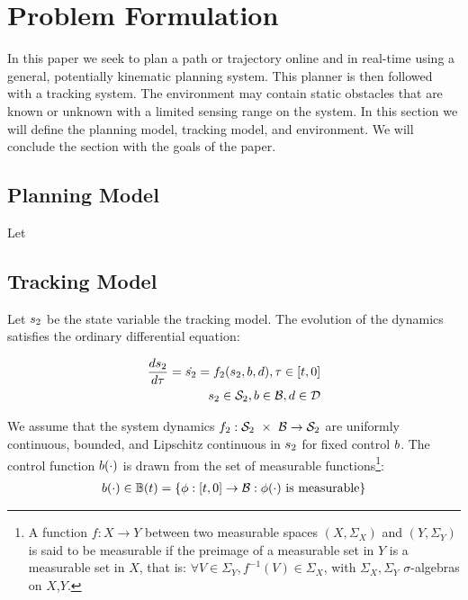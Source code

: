 \section{Problem Formulation \label{sec:formulation}}
In this paper we seek to plan a path or trajectory online and in real-time using a general, potentially kinematic planning system. This planner is then followed with a tracking system. The environment may contain static obstacles that are known or unknown with a limited sensing range on the system. In this section we will define the planning model, tracking model, and environment. We will conclude the section with the goals of the paper.

\subsection{Planning Model}

Let 

\subsection{Tracking Model}
Let $s_2$ be the state variable the tracking model. The evolution of the dynamics satisfies the ordinary differential equation:

\begin{equation}
\begin{aligned}
\label{eq:fdyn}
\frac{ds_2}{d\tau} = \dot{s_2} = f_2(s_2, b, d), \tau \in [t, 0] \\
s_2 \in \mathcal{S}_2, b \in \mathcal{B}, d \in \mathcal{D}
\end{aligned}
\end{equation}

We assume that the system dynamics $f_2 : \mathcal{S}_2\ \times\ \mathcal{B} \rightarrow \mathcal{S}_2$ are uniformly continuous, bounded, and Lipschitz continuous in $s_2$ for fixed control $b$. The control function $b(\cdot)$ is drawn from the set of measurable functions\footnote{A function $f:X\to Y$ between two measurable spaces $(X,\Sigma_X)$ and $(Y,\Sigma_Y)$ is said to be measurable if the preimage of a measurable set in $Y$ is a measurable set in $X$, that is: $\forall V\in\Sigma_Y, f^{-1}(V)\in\Sigma_X$, with $\Sigma_X,\Sigma_Y$ $\sigma$-algebras on $X$,$Y$.}:
\begin{equation}
\begin{aligned}
b(\cdot) \in \mathbb{B}(t) = \{\phi: [t, 0] \rightarrow \mathcal{B}: \phi(\cdot) \text{ is measurable}\}
\end{aligned}
\end{equation}

